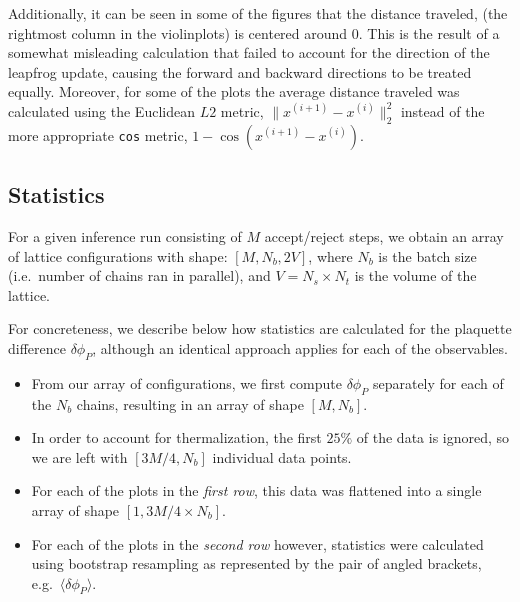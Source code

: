 Additionally, it can be seen in some of the figures that the distance traveled,
(the rightmost column in the violinplots) is centered around $0$.
%
This is the result of a somewhat misleading calculation that failed to account
for the direction of the leapfrog update, causing the forward and backward
directions to be treated equally.
%
Moreover, for some of the plots the average distance traveled was calculated
using the Euclidean $L2$ metric, $\|x^{(i+1)} - x^{(i)}\|^{2}_{2}$ instead of the
more appropriate \texttt{cos} metric, $1 - \cos(x^{(i+1)} - x^{(i)})$.
%
\subsection{Statistics}
%
For a given inference run consisting of $M$ accept/reject steps, we obtain an
array of lattice configurations with shape: $[M, N_{b}, 2V]$, where $N_b$ is
the batch size (i.e.\ number of chains ran in parallel), and $V = N_{s} \times
N_{t}$ is the volume of the lattice.

For concreteness, we describe below how statistics are calculated for the plaquette
difference $\delta \phi_{P}$, although an identical approach applies for each
of the observables.

\begin{itemize}
  \item From our array of configurations, we first compute $\delta \phi_{P}$
    separately for each of the $N_b$ chains, resulting in an array of shape
    $[M, N_{b}]$.
  \item In order to account for thermalization, the first $25\%$ of the data is
    ignored, so we are left with $[3M/4, N_b]$ individual data points.
  \item For each of the plots in the \emph{first row}, this data was flattened into a
    single array of shape $[1, 3M/4 \times N_{b}]$.
  \item For each of the plots in the \emph{second row} however, statistics were
    calculated using bootstrap resampling as represented by the pair of angled
    brackets, e.g.\ $\langle \delta \phi_{P}\rangle$.
\end{itemize}

